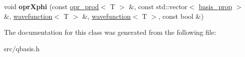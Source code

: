 \begin{DoxyCompactItemize}
\item 
\mbox{\label{classqbasis_1_1opr__prod_aaec0b4b8d0787d76e9e56aac52e4f346}} 
void {\bfseries opr\+Xphi} (const \hyperlink{classqbasis_1_1opr__prod}{opr\+\_\+prod}$<$ T $>$ \&, const std\+::vector$<$ \hyperlink{classqbasis_1_1basis__prop}{basis\+\_\+prop} $>$ \&, \hyperlink{classqbasis_1_1wavefunction}{wavefunction}$<$ T $>$ \&, \hyperlink{classqbasis_1_1wavefunction}{wavefunction}$<$ T $>$, const bool \&)
\end{DoxyCompactItemize}


The documentation for this class was generated from the following file\+:\begin{DoxyCompactItemize}
\item 
src/qbasis.\+h\end{DoxyCompactItemize}
